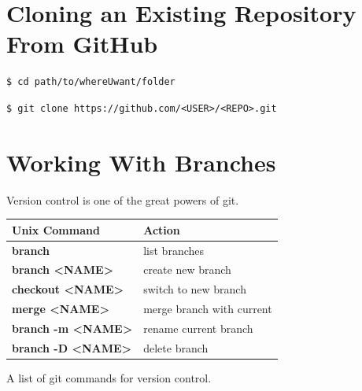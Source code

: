 \vspace{1cm}

\section{Cloning an Existing Repository From GitHub }


\begin{shaded}
\begin{verbatim}
$ cd path/to/whereUwant/folder
\end{verbatim}
\end{shaded}
\begin{shaded}
\begin{verbatim}
$ git clone https://github.com/<USER>/<REPO>.git
\end{verbatim}
\end{shaded}

\vspace{1cm}

\section{Working With Branches }
Version control is one of the great powers of git.

\begin{margintable}[80pt]
  \footnotesize%
  \begin{center}
    \begin{tabular}{ll}
      \toprule
     Unix Command & Action \\
      \midrule
     \bf{branch}  & list branches       \\
    \bf{branch} <NAME>  & create new branch        \\
    \bf{checkout} <NAME>  & switch to new branch        \\
     \bf{merge} <NAME>  & merge branch with current      \\
      \bf{branch -m} <NAME>  & rename current branch \\
      \bf{branch -D} <NAME>  & delete branch       \\
      \bottomrule
    \end{tabular}
  \end{center}
  \caption{A list of git commands for version control.}
  \label{tab:font-sizes}
\end{margintable}


